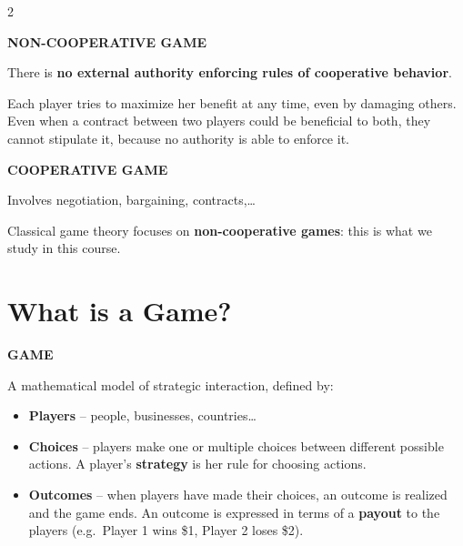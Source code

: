 \documentclass[a4paper,9pt]{extarticle}
\begin{document}
\begin{multicols}{2}
\begin{definition}

\textbf{NON-COOPERATIVE GAME}

There is \textbf{no external authority enforcing rules of cooperative behavior}.

Each player tries to maximize her benefit at any time, even by damaging others. Even when a
contract between two players could be beneficial to both, they cannot stipulate it, because
no authority is able to enforce it.

\end{definition}


\begin{definition}

\textbf{COOPERATIVE GAME}

Involves negotiation, bargaining, contracts,\dots

\end{definition}


\begin{important}

Classical game theory focuses on \textbf{non-cooperative games}: this is what we study in
this course.

\end{important}



\section{What is a Game?}


\begin{definition}

\textbf{GAME}

A mathematical model of strategic interaction, defined by:

\begin{itemize}

\item \textbf{Players} -- people, businesses, countries\dots

\item \textbf{Choices} -- players make one or multiple choices between different possible
actions. A player's \textbf{strategy} is her rule for choosing actions.

\item \textbf{Outcomes} -- when players have made their choices, an outcome is realized
and the game ends. An outcome is expressed in terms of a \textbf{payout} to the players
(e.g.\ Player 1 wins \$1, Player 2 loses \$2).


\end{itemize}
\end{definition}
\end{multicols}
\end{document}
